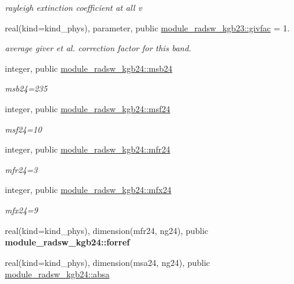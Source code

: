 \begin{Indent}
\begin{DoxyCompactItemize}
\begin{DoxyCompactList}\small\item\em rayleigh extinction coefficient at all v \end{DoxyCompactList}\item 
real(kind=kind\+\_\+phys), parameter, public \hyperlink{group__module__radsw__kgbnn_ga5f6ced06169db4b7470e20d5639ac54c}{module\+\_\+radsw\+\_\+kgb23\+::givfac} = 1.
\begin{DoxyCompactList}\small\item\em average giver et al. correction factor for this band. \end{DoxyCompactList}\item 
integer, public \hyperlink{group__module__radsw__kgbnn_ga0ec09b4df9fbfa868844ad93a84cbe31}{module\+\_\+radsw\+\_\+kgb24\+::msb24}
\begin{DoxyCompactList}\small\item\em msb24=235 \end{DoxyCompactList}\item 
integer, public \hyperlink{group__module__radsw__kgbnn_ga52d0fde0af1d5427acf0d1924f393cdc}{module\+\_\+radsw\+\_\+kgb24\+::msf24}
\begin{DoxyCompactList}\small\item\em msf24=10 \end{DoxyCompactList}\item 
integer, public \hyperlink{group__module__radsw__kgbnn_ga3a1c3808493ce89f2218116a02350e51}{module\+\_\+radsw\+\_\+kgb24\+::mfr24}
\begin{DoxyCompactList}\small\item\em mfr24=3 \end{DoxyCompactList}\item 
integer, public \hyperlink{group__module__radsw__kgbnn_ga6fcafb0e1605ad49a252ed1e22b00a5b}{module\+\_\+radsw\+\_\+kgb24\+::mfx24}
\begin{DoxyCompactList}\small\item\em mfx24=9 \end{DoxyCompactList}\item 
real(kind=kind\+\_\+phys), dimension(mfr24, ng24), public {\bfseries module\+\_\+radsw\+\_\+kgb24\+::forref}
\item 
real(kind=kind\+\_\+phys), dimension(msa24, ng24), public \hyperlink{group__module__radsw__kgbnn_ga06965ec156c4e1d18d50a70ba43bd8e1}{module\+\_\+radsw\+\_\+kgb24\+::absa}

\end{DoxyCompactItemize}
\end{Indent}

